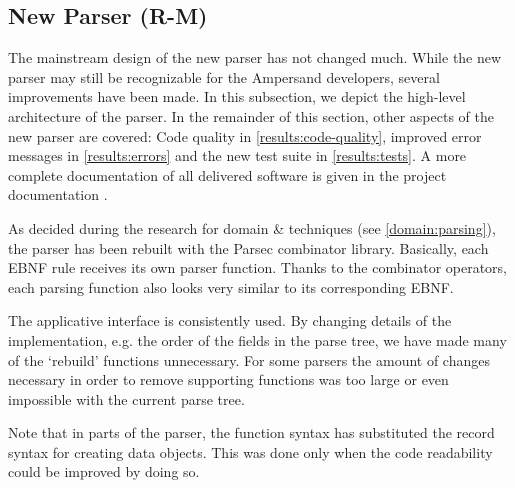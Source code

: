 
\subsection{New Parser (R-M)}
\label{subsec:design-parser}
The mainstream design of the new parser has not changed much.
While the new parser may still be recognizable for the Ampersand developers, several improvements have been made.
In this subsection, we depict the high-level architecture of the parser.
In the remainder of this section, other aspects of the new parser are covered: Code quality in \autoref{results:code-quality}, improved error messages in \autoref{results:errors} and the new test suite in \autoref{results:tests}.
A more complete documentation of all delivered software is given in the project documentation .

As decided during the research for domain \& techniques (see \autoref{domain:parsing}), the parser has been rebuilt with the Parsec combinator library.
Basically, each EBNF rule receives its own parser function.
Thanks to the combinator operators, each parsing function also looks very similar to its corresponding EBNF.

The applicative interface is consistently used.
By changing details of the implementation, e.g. the order of the fields in the parse tree, we have made many of the `rebuild' functions unnecessary.
For some parsers the amount of changes necessary in order to remove supporting functions was too large or even impossible with the current parse tree.

Note that in parts of the parser, the function syntax has substituted the record syntax for creating data objects.
This was done only when the code readability could be improved by doing so.

